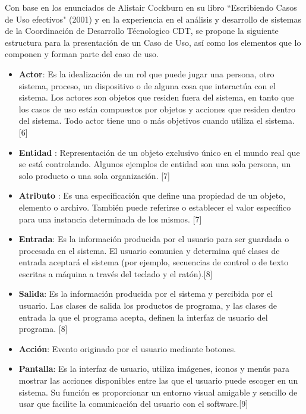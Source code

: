 \documentclass{article}
\begin{document}
\begin{multicols}{2}
	Con base en los enunciados de Alistair Cockburn en su libro ``Escribiendo Casos de Uso efectivos" (2001) y en la experiencia en el análisis y desarrollo de sistemas de la Coordinación de Desarrollo Técnologico CDT, se propone la siguiente estructura para la presentación de un Caso de Uso, así como los elementos que lo componen y forman parte del caso de uso.
	
	\begin{itemize}
		\item \textbf{Actor}: Es la idealización de un rol que puede jugar una persona, otro sistema, proceso, un dispositivo o de alguna cosa que interactúa con el sistema. Los actores son objetos que residen fuera del sistema, en tanto que los casos de uso están compuestos por objetos y acciones que residen dentro del sistema. Todo actor tiene uno o más objetivos cuando utiliza el sistema. [6]
		
		\item \textbf{Entidad} : Representación de un objeto exclusivo único en el mundo real que se está controlando. Algunos ejemplos de entidad son una sola persona, un solo producto o una sola organización. [7]
		
		\item \textbf{Atributo} : Es una especificación que define una propiedad de un objeto, elemento o archivo. También puede referirse o establecer el valor específico para una instancia determinada de los mismos. [7]
		
		\item \textbf{Entrada}: Es la información producida por el usuario para ser guardada o procesada en el sistema. El usuario comunica y determina qué clases de entrada aceptará el sistema (por ejemplo, secuencias de control o de texto escritas a máquina a través del teclado y el ratón).[8]
		
		\item \textbf{Salida}: Es la información producida por el sistema y percibida por el usuario. Las clases de salida los productos de programa, y las clases de entrada la que el programa acepta, definen la interfaz de usuario del programa. [8]
		
		\item \textbf{Acción}: Evento originado por el usuario mediante botones.
		
		\item \textbf{Pantalla}: Es la interfaz de usuario, utiliza imágenes, iconos y menús para mostrar las acciones disponibles entre las que el usuario puede escoger en un sistema. Su función es proporcionar un entorno visual amigable y sencillo de usar que facilite la comunicación del usuario con el software.[9]
		

\end{itemize}
\end{multicols}
\end{document}
